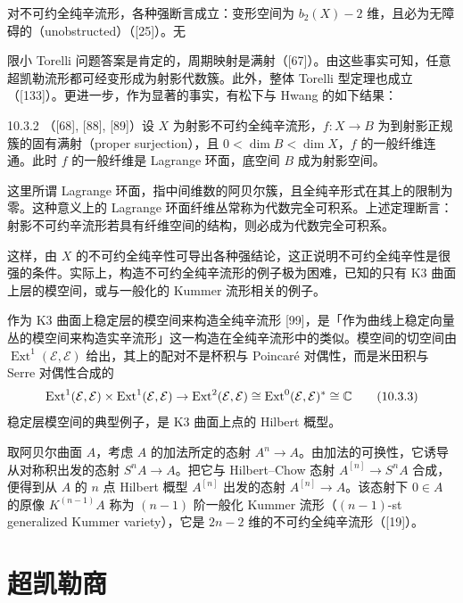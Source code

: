 对不可约全纯辛流形，各种强断言成立：变形空间为 $b_2(X)-2$ 维，且必为无障碍的（unobstructed）（[25]）。无

限小 Torelli 问题答案是肯定的，周期映射是满射（[67]）。由这些事实可知，任意超凯勒流形都可经变形成为射影代数簇。此外，整体 Torelli 型定理也成立（[133]）。更进一步，作为显著的事实，有松下与 Hwang 的如下结果：

\begin{theorem}{10.3.2}
  （[68], [88], [89]）设 $X$ 为射影不可约全纯辛流形，$f\colon X\to B$ 为到射影正规簇的固有满射（proper surjection），且 $0<\dim B<\dim X$，$f$ 的一般纤维连通。此时 $f$ 的一般纤维是 Lagrange 环面，底空间 $B$ 成为射影空间。
\end{theorem}

这里所谓 Lagrange 环面，指中间维数的阿贝尔簇，且全纯辛形式在其上的限制为零。这种意义上的 Lagrange 环面纤维丛常称为代数完全可积系。上述定理断言：射影不可约辛流形若具有纤维空间的结构，则必成为代数完全可积系。

这样，由 $X$ 的不可约全纯辛性可导出各种强结论，这正说明不可约全纯辛性是很强的条件。实际上，构造不可约全纯辛流形的例子极为困难，已知的只有 K3 曲面上层的模空间，或与一般化的 Kummer 流形相关的例子。

作为 K3 曲面上稳定层的模空间来构造全纯辛流形 [99]，是「作为曲线上稳定向量丛的模空间来构造实辛流形」这一构造在全纯辛流形中的类似。模空间的切空间由 $\operatorname{Ext}^1(\mathcal{E},\mathcal{E})$ 给出，其上的配对不是杯积与 Poincaré 对偶性，而是米田积与 Serre 对偶性合成的
\begin{equation}
  \operatorname{Ext}^1(\mathcal{E},\mathcal{E})\times\operatorname{Ext}^1(\mathcal{E},\mathcal{E})
  \to\operatorname{Ext}^2(\mathcal{E},\mathcal{E})\cong\operatorname{Ext}^0(\mathcal{E},\mathcal{E})^*\cong\mathbb{C} \tag{10.3.3}
\end{equation}
稳定层模空间的典型例子，是 K3 曲面上点的 Hilbert 概型。

取阿贝尔曲面 $A$，考虑 $A$ 的加法所定的态射 $A^n\to A$。由加法的可换性，它诱导从对称积出发的态射 $S^nA\to A$。把它与 Hilbert--Chow 态射 $A^{[n]}\to S^nA$ 合成，便得到从 $A$ 的 $n$ 点 Hilbert 概型 $A^{[n]}$ 出发的态射 $A^{[n]}\to A$。该态射下 $0\in A$ 的原像 $K^{(n-1)}A$ 称为 $(n-1)$ 阶一般化 Kummer 流形（$(n-1)$-st generalized Kummer variety），它是 $2n-2$ 维的不可约全纯辛流形（[19]）。

\section{超凯勒商}

